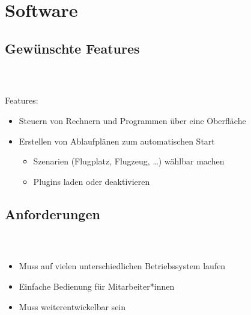 \documentclass[accentcolor=tud1b,colorbacktitle,landscape,german,presentation]{tudbeamer}
\newcommand{\ftitle}{
	\frametitle{\insertsectionhead \\ {\small \insertsubsectionhead}}
}
\begin{document}
\section{Software}
\subsection{Gewünschte Features}
\begin{frame}
	\ftitle
	Features:
	\begin{itemize}
		\item Steuern von Rechnern und Programmen über eine Oberfläche\pause
		\item Erstellen von Ablaufplänen zum automatischen Start\pause
			\begin{itemize}
				\item Szenarien (Flugplatz, Flugzeug, \dots) wählbar machen\pause
				\item Plugins laden oder deaktivieren
			\end{itemize}
	\end{itemize}
\end{frame}

\subsection{Anforderungen}
\begin{frame}
	\ftitle
	\begin{itemize}
		\item Muss auf vielen unterschiedlichen Betriebssystem laufen\pause
		\item Einfache Bedienung für Mitarbeiter*innen\pause
		\item Muss weiterentwickelbar sein
	\end{itemize}
\end{frame}
\end{document}
